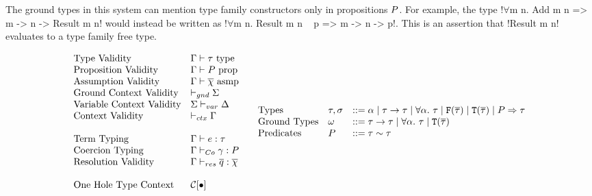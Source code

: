 \documentclass[format=acmsmall,manuscript,review,screen,nonacm,margin=1in,11pt]{acmart}
\begin{document}
The ground types in this system can mention type family constructors only in propositions $P$.
For example, the type !$\forall$m n. Add m n => m -> n -> Result m n! would instead be written
as !$\forall$m n. Result m n ~ p => m -> n -> p!. This is an assertion that !Result m n! evaluates to a
type family free type.


\begin{figure}[ht]
    \footnotesize
  \[
    \begin{array}{l l l}
      &\text{Type Validity}               &\Gamma \vdash \tau~\text{type}\\
      &\text{Proposition Validity}        &\Gamma \vdash P~\text{prop}\\
      &\text{Assumption Validity}      &\Gamma \vdash \overline{\chi}~\text{asmp}\\
      &\text{Ground Context Validity}     &\vdash_{gnd}\Sigma\\
      &\text{Variable Context Validity}   &\Sigma\vdash_{var}\Delta\\
      &\text{Context Validity}            &\vdash_{ctx}\Gamma\\
      \\
      &\text{Term Typing}              &\Gamma \vdash e : \tau\\
      &\text{Coercion Typing}          &\Gamma \vdash_{Co} \gamma : P\\
      &\text{Resolution Validity}      &\Gamma \vdash_{res} \overline{q} : \overline{\chi}\\
      \\
      &\text{One Hole Type Context}    &\mathcal{C}[\bullet]
    \end{array}
    \begin{array}{l l l l l}
      &\text{Types}           &\tau,\sigma  &\mathrel{{:}{:}{=}} \alpha \mathrel{\mid} \tau\to\tau \mathrel{\mid} \forall\alpha.~\tau
                                              \mathrel{\mid} \texttt{F}(\overline{\tau}) \mathrel{\mid} \texttt{T}(\overline{\tau})
                                              \mathrel{\mid} {P\Rightarrow\tau}&\\
      &\text{Ground Types}    &\omega         &\mathrel{{:}{:}{=}} \tau\to\tau \mathrel{\mid} \forall\alpha.~\tau \mathrel{\mid} \texttt{T}(\overline{\tau})\\
      &\text{Predicates}      &P       &\mathrel{{:}{:}{=}} \tau\mathrel{\sim}\tau\\

\end{array}\]
\end{figure}
\end{document}
